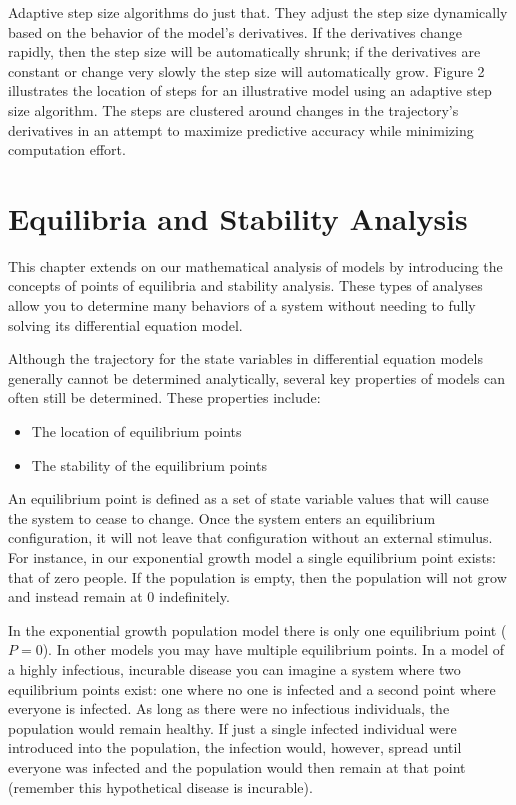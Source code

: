\documentclass[]{memoir}
\begin{document}
Adaptive step size algorithms do just that. They adjust the step size
dynamically based on the behavior of the model's derivatives. If the
derivatives change rapidly, then the step size will be automatically
shrunk; if the derivatives are constant or change very slowly the step
size will automatically grow. Figure 2 illustrates the location of steps
for an illustrative model using an adaptive step size algorithm. The
steps are clustered around changes in the trajectory's derivatives in an
attempt to maximize predictive accuracy while minimizing computation
effort.

\chapter{Equilibria and Stability Analysis}

This chapter extends on our mathematical analysis of models by
introducing the concepts of points of equilibria and stability analysis.
These types of analyses allow you to determine many behaviors of a
system without needing to fully solving its differential equation model.

Although the trajectory for the state variables in differential equation
models generally cannot be determined analytically, several key
properties of models can often still be determined. These properties
include:

\begin{itemize}
\itemsep1pt\parskip0pt
\item
  The location of equilibrium points
\item
  The stability of the equilibrium points
\end{itemize}

An equilibrium point is defined as a set of state variable values that
will cause the system to cease to change. Once the system enters an
equilibrium configuration, it will not leave that configuration without
an external stimulus. For instance, in our exponential growth model a
single equilibrium point exists: that of zero people. If the population
is empty, then the population will not grow and instead remain at 0
indefinitely.

In the exponential growth population model there is only one equilibrium
point ($P=0$). In other models you may have multiple equilibrium points.
In a model of a highly infectious, incurable disease you can imagine a
system where two equilibrium points exist: one where no one is infected
and a second point where everyone is infected. As long as there were no
infectious individuals, the population would remain healthy. If just a
single infected individual were introduced into the population, the
infection would, however, spread until everyone was infected and the
population would then remain at that point (remember this hypothetical
disease is incurable).
\end{document}

